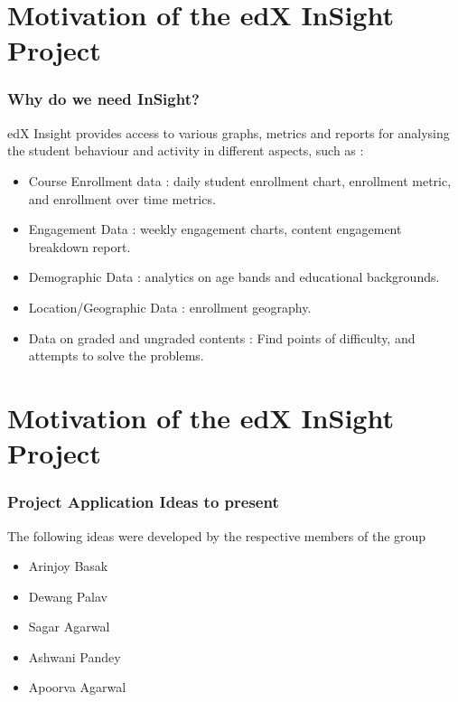 \documentclass[12pt,xcolor=dvipsnames]{beamer}
\begin{document}
\section{Motivation of the edX InSight Project}
\begin{frame}[t]
\frametitle{Why do we need InSight?}

edX Insight provides access to various graphs, metrics and reports for analysing the student behaviour and activity in different aspects, such as :

\begin{itemize}

\item Course Enrollment data : daily student enrollment chart, enrollment metric, and enrollment over time metrics.

\item Engagement Data : weekly engagement charts, content engagement breakdown report.
\item Demographic Data : analytics on age bands and educational backgrounds.
\item Location/Geographic Data : enrollment geography.
\item Data on graded and ungraded contents : Find points of difficulty, and attempts to solve the problems.

\end{itemize}
\end{frame}

\section{Motivation of the edX InSight Project}
\begin{frame}[t]
\frametitle{Project Application Ideas to present}

The following ideas were developed by the respective members of the group

\begin{itemize}
\item Arinjoy Basak
\item Dewang Palav
\item Sagar Agarwal
\item Ashwani Pandey
\item Apoorva Agarwal
\end{itemize}
\end{frame}
\end{document}

